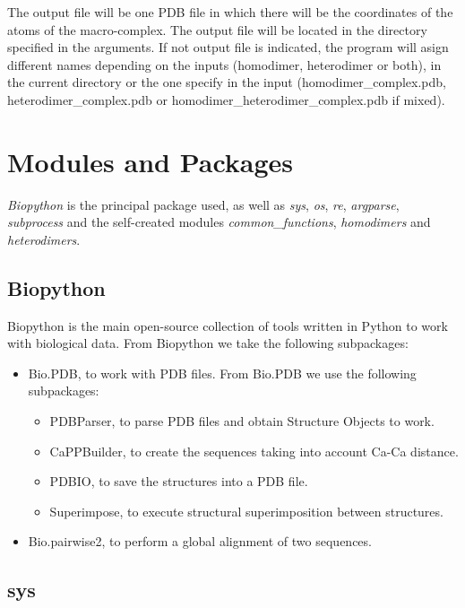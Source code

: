 \documentclass[a4paper,10pt]{report}
\begin{document}
The output file will be one PDB file in which there will be the coordinates of the atoms of the macro-complex. The output file will be located in the directory specified in the arguments. 
If not output file is indicated, the program will asign different names depending on the inputs (homodimer, heterodimer or both), in the current directory or the one specify in the input (homodimer_complex.pdb, heterodimer_complex.pdb or homodimer_heterodimer_complex.pdb if mixed).


\section{Modules and Packages}

\textit{Biopython} is the principal package used, as well as \textit{sys}, \textit{os}, \textit{re}, \textit{argparse}, \textit{subprocess} and the self-created modules \textit{common_functions}, \textit{homodimers} and \textit{heterodimers}. 

\subsection{Biopython}

Biopython is the main open-source collection of tools written in Python to work with biological data. From Biopython we take the following subpackages:

\begin{itemize}
 \item Bio.PDB, to work with PDB files. From Bio.PDB we use the following subpackages:
 \begin{itemize}
  \item PDBParser, to parse PDB files and obtain Structure Objects to work.
  \item CaPPBuilder, to create the sequences taking into account Ca-Ca distance.
  \item PDBIO, to save the structures into a PDB file.
  \item Superimpose, to execute structural superimposition between structures.
 \end{itemize}
 \item Bio.pairwise2, to perform a global alignment of two sequences.
\end{itemize}


\subsection{sys}
\end{document}
